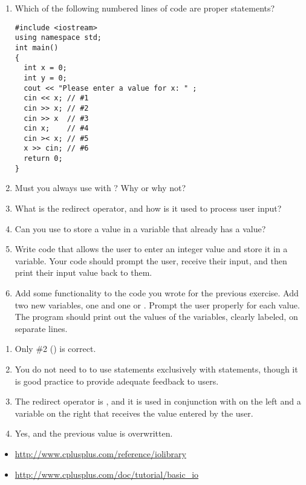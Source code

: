 \begin{enumerate}
	\item Which of the following numbered lines of code are proper  statements?

\noindent\begin{minipage}{\linewidth}\begin{lstlisting}
#include <iostream>
using namespace std;
int main()
{
  int x = 0;
  int y = 0;
  cout << "Please enter a value for x: " ;
  cin << x; // #1
  cin >> x; // #2
  cin >> x  // #3
  cin x;    // #4
  cin >< x; // #5
  x >> cin; // #6
  return 0;
}
\end{lstlisting}\end{minipage}

  \item Must you always use  with ? Why or why not?
  \item What is the redirect operator, and how is it used to process user input?
  \item Can you use  to store a value in a variable that already has a value?

  \item Write code that allows the user to enter an integer value and store it in a variable. Your code should prompt the user, receive their input, and then print their input value back to them.
  \item Add some functionality to the code you wrote for the previous exercise. Add two new variables, one  and one  or . Prompt the user properly for each value. The program should print out the values of the variables, clearly labeled, on separate lines.

\end{enumerate}


\begin{enumerate}
	\item Only \#2 () is correct.
	\item You do not need to to use  statements exclusively with  statements, though it is good practice to provide adequate feedback to users.
	\item The redirect operator is \Code{>>}, and it is used in conjunction with  on the left and a variable on the right that receives the value entered by the user.
	\item Yes, and the previous value is overwritten.
\end{enumerate}


\begin{itemize}
\item \url{http://www.cplusplus.com/reference/iolibrary}
\item \url{http://www.cplusplus.com/doc/tutorial/basic_io}
\end{itemize}	

